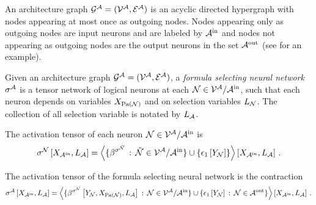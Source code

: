 \begin{definition}
    \label{def:fsNeuralNetwork}


    An architecture graph $\mathcal{G}^{\mathcal{A}}=(\mathcal{V}^{\mathcal{A}},\mathcal{E}^{\mathcal{A}})$ is an acyclic directed hypergraph with nodes appearing at most once as outgoing nodes.
    Nodes appearing only as outgoing nodes are input neurons and are labeled by $\mathcal{A}^{\mathrm{in}}$ and nodes not appearing as outgoing nodes are the output neurons in the set $\mathcal{A}^{\mathrm{out}}$ (see  for an example).

    Given an architecture graph $\mathcal{G}^{\mathcal{A}}=(\mathcal{V}^{\mathcal{A}},\mathcal{E}^{\mathcal{A}})$, a \emph{formula selecting neural network} $\sigma^{\mathcal{A}}$ is a tensor network of logical neurons at each $\mathcal{N}\in\mathcal{V}^{\mathcal{A}}/\mathcal{A}^{\mathrm{in}}$, such that each neuron depends on variables $X_{\mathrm{Pa}(\mathcal{N})}$ and on selection variables $L_{\mathcal{N}}$.
    The collection of all selection variable is notated by $L_{\mathcal{A}}$.

    The activation tensor of each neuron $\mathcal{N}\in\mathcal{V}^{\mathcal{A}}/\mathcal{A}^{\mathrm{in}}$ is
    \begin{align*}
        \sigma^{\mathcal{N}}\left[X_{\mathcal{A}^{\mathrm{in}}},L_{\mathcal{A}}\right]
        = \left\langle 
            \{\beta^{\sigma^{\tilde{\mathcal{N}}}} \,:\, \tilde{\mathcal{N}}\in\mathcal{V}^{\mathcal{A}}/\mathcal{A}^{\mathrm{in}} \} \cup \{\epsilon_{1}\left[Y_{\mathcal{N}}\right]\}
        \right\rangle \left[ X_{\mathcal{A}^{\mathrm{in}}},L_{\mathcal{A}} \right] \, .
    \end{align*}

    The activation tensor of the formula selecting neural network is the contraction
    \begin{align*}
        \sigma^{\mathcal{A}}\left[X_{\mathcal{A}^{\mathrm{in}}},L_{\mathcal{A}}\right]
        = \left\langle 
            \{\beta^{\sigma^{\mathcal{N}}}\left[Y_{\mathcal{N}},X_{\mathrm{Pa}(\mathcal{N})},L_{\mathcal{A}}\right] \,:\, \mathcal{N}\in\mathcal{V}^{\mathcal{A}}/\mathcal{A}^{\mathrm{in}} \} \cup \{\epsilon_{1}\left[Y_{\mathcal{N}}\right] \,:\, \mathcal{N}\in\mathcal{A}^{\mathrm{out}}\}
        \right\rangle \left[ X_{\mathcal{A}^{\mathrm{in}}},L_{\mathcal{A}} \right] \, .
    \end{align*}


\end{definition}
